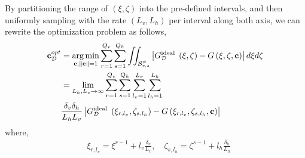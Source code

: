 By partitioning the range of $(\xi, \zeta)$ into the pre-defined intervals, and then uniformly sampling with the rate $(L_v, L_h)$ per interval along both axis,  we can rewrite the optimization problem as follows, 
\begin{align}
 {\bf{c}}^{opt}_{\mathcal{D}} &= \underset{{{\bf{c}}, \|{\bf{c}}\|=1}}{{\arg \min }} \sum_{r=1}^{Q_v}\sum_{s=1}^{Q_h}\iint_{\mathcal{B}^{\psi}_{r,s}}\left|G_{\mathcal{D}}^{\text {ideal }}\left(\xi, \zeta \right)-G\left(\xi, \zeta, {\bf{c}}\right)\right| d \xi d \zeta \nonumber\\&
 = \underset{L_h, L_v \rightarrow \infty}{\lim}\sum_{r=1}^{Q_v}\sum_{s=1}^{Q_h}\sum_{l_v =1}^{L_v}\sum_{l_h =1}^{L_h}\nonumber\\&\frac{\delta_v\delta_h}{L_hL_v}
\left|G_{\mathcal{D}}^{\text {ideal }}\left(\xi_{r, l_v}, \zeta_{s,l_h}\right)-G\left(\xi_{r, l_v}, \zeta_{s,l_h}, {\bf{c}}\right)\right|\label{alternative_opt}
\end{align}
where, 
\begin{align}
    &\xi_{r,l_v} = \xi^{r-1} + l_v\frac{\delta_v}{L_v}, \quad \zeta_{s, l_h} = \zeta^{s-1} + l_h\frac{\delta_h}{L_h} \label{l_v_l_h}
\end{align}




